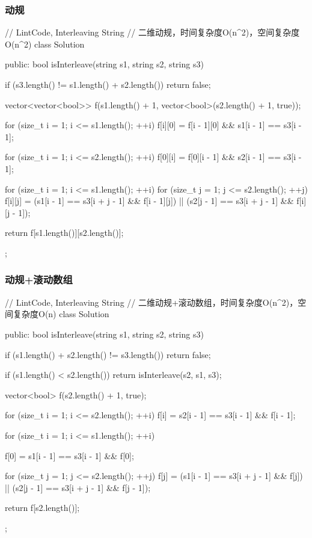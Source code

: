 \subsubsection{动规}
\begin{Code}
// LintCode, Interleaving String
// 二维动规，时间复杂度O(n^2)，空间复杂度O(n^2)
class Solution {
public:
    bool isInterleave(string s1, string s2, string s3) {
        if (s3.length() != s1.length() + s2.length())
            return false;

        vector<vector<bool>> f(s1.length() + 1,
                vector<bool>(s2.length() + 1, true));

        for (size_t i = 1; i <= s1.length(); ++i)
            f[i][0] = f[i - 1][0] && s1[i - 1] == s3[i - 1];

        for (size_t i = 1; i <= s2.length(); ++i)
            f[0][i] = f[0][i - 1] && s2[i - 1] == s3[i - 1];

        for (size_t i = 1; i <= s1.length(); ++i)
            for (size_t j = 1; j <= s2.length(); ++j)
                f[i][j] = (s1[i - 1] == s3[i + j - 1] && f[i - 1][j])
                        || (s2[j - 1] == s3[i + j - 1] && f[i][j - 1]);

        return f[s1.length()][s2.length()];
    }
};
\end{Code}


\subsubsection{动规+滚动数组}
\begin{Code}
// LintCode, Interleaving String
// 二维动规+滚动数组，时间复杂度O(n^2)，空间复杂度O(n)
class Solution {
public:
    bool isInterleave(string s1, string s2, string s3) {
        if (s1.length() + s2.length() != s3.length())
            return false;

        if (s1.length() < s2.length())
            return isInterleave(s2, s1, s3);

        vector<bool> f(s2.length() + 1, true);

        for (size_t i = 1; i <= s2.length(); ++i)
            f[i] = s2[i - 1] == s3[i - 1] && f[i - 1];

        for (size_t i = 1; i <= s1.length(); ++i) {
            f[0] = s1[i - 1] == s3[i - 1] && f[0];

            for (size_t j = 1; j <= s2.length(); ++j)
                f[j] = (s1[i - 1] == s3[i + j - 1] && f[j])
                        || (s2[j - 1] == s3[i + j - 1] && f[j - 1]);
        }

        return f[s2.length()];
    }
};
\end{Code}


